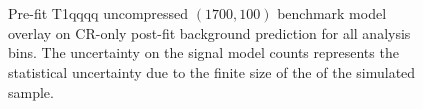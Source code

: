 \begin{figure}[!h]
{        \label{fig:T1qqqq_uncompressed_MR_4j}
    } \\
     ~~
     \\
    \caption{
        Pre-fit T1qqqq uncompressed $(1700,100)$ benchmark model overlay on
        CR-only post-fit background prediction for all analysis bins. The
        uncertainty on the signal model counts represents the statistical
        uncertainty due to the finite size of the of the simulated sample.
    }
    \label{fig:T1qqqq_uncompressed_MR}
\end{figure}


